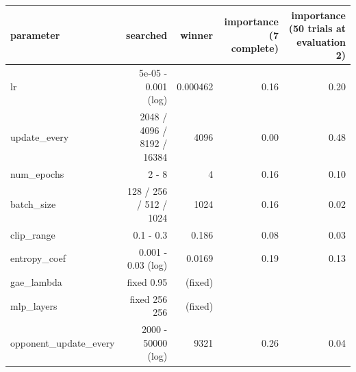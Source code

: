 \begin{tabular}{lrrrr}
\toprule
parameter & searched & winner & importance (7 complete) & importance (50 trials at evaluation 2) \\
\midrule
lr & 5e-05 - 0.001 (log) & 0.000462 & 0.16 & 0.20 \\
update\_every & 2048 / 4096 / 8192 / 16384 & 4096 & 0.00 & 0.48 \\
num\_epochs & 2 - 8 & 4 & 0.16 & 0.10 \\
batch\_size & 128 / 256 / 512 / 1024 & 1024 & 0.16 & 0.02 \\
clip\_range & 0.1 - 0.3 & 0.186 & 0.08 & 0.03 \\
entropy\_coef & 0.001 - 0.03 (log) & 0.0169 & 0.19 & 0.13 \\
gae\_lambda & fixed 0.95 & (fixed) &  &  \\
mlp\_layers & fixed 256 256 & (fixed) &  &  \\
opponent\_update\_every & 2000 - 50000 (log) & 9321 & 0.26 & 0.04 \\
\bottomrule
\end{tabular}
